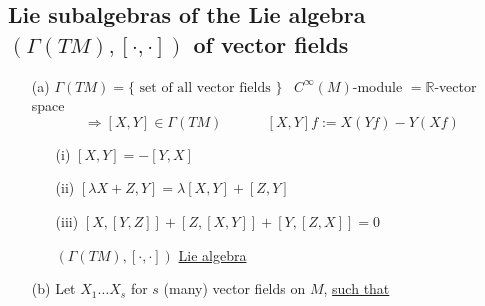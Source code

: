 \subsection{Lie subalgebras of the Lie algebra $(\Gamma(TM) , [ \cdot , \cdot ] )$ of vector fields}

\begin{enumerate}
  \item[(a)] $\Gamma(TM) = \lbrace \text{ set of all vector fields } \rbrace$ \quad \, $C^{\infty}(M)$-module $ = \mathbb{R}$-vector space \[
\Longrightarrow [X,Y] \in \Gamma(TM) \quad \quad \quad \, [X,Y] f := X(Yf) - Y(Xf)
\]
\begin{enumerate}
\item[(i)] $[X,Y] = -[Y,X]$ 
\item[(ii)] $[\lambda X + Z, Y] = \lambda [X,Y] + [Z,Y]$
\item[(iii)] $[X,[Y,Z]]  + [Z,[X,Y]] + [Y,[Z,X]] =0$ 

$(\Gamma(TM), [\cdot, \cdot])$ \underline{Lie algebra}
\end{enumerate}
\item[(b)] Let $X_1\dots X_s$ for $s$ (many) vector fields on $M$, \underline{such that}
\end{enumerate}

